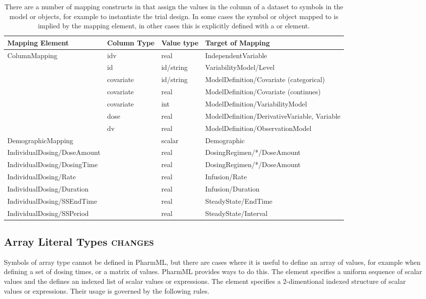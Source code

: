 \begin{table}[ht!]
\begin{center}
\small
\begin{tabular}{llll}\toprule
Mapping Element & Column Type & Value type & Target of Mapping \\\midrule
ColumnMapping & idv & real & IndependentVariable  \\
			& id			& id/string & VariabilityModel/Level \\
			& covariate & id/string &  ModelDefinition/Covariate (categorical) \\	
			& covariate & real &  ModelDefinition/Covariate (continues) \\
			& covariate & int &  ModelDefinition/VariabilityModel \\
			& dose 	& real &  ModelDefinition/DerivativeVariable, Variable \\
			& dv 	& real &  ModelDefinition/ObservationModel \\
DemographicMapping & & scalar & Demographic \\
IndividualDosing/DoseAmount & & real & DosingRegimen/*/DoseAmount \\
IndividualDosing/DosingTime & & real & DosingRegimen/*/DoseAmount \\
IndividualDosing/Rate &  & real & Infusion/Rate \\
IndividualDosing/Duration & & real &Infusion/Duration \\
IndividualDosing/SSEndTime & & real & SteadyState/EndTime \\
IndividualDosing/SSPeriod & & real & SteadyState/Interval \\\bottomrule
\end{tabular}
\end{center}
\caption{There are a number of mapping constructs in \pharmml that assign the
values in the column of a dataset to symbols in the model or objects,
for example to instantiate the trial design. In some cases the symbol
or object mapped to is implied by the mapping element, in other cases
this is explicitly defined with a  or 
element.}
\label{tab:data-set-mapping}
\end{table}%


\subsection{Array Literal Types  {\color{red} \scshape{changes}}}
Symbols of array type cannot be defined in PharmML, but there are cases where 
it is useful to define an array of values, for example when defining a set of dosing times, 
or a matrix of values. PharmML provides ways to do this. The  
element specifies a uniform sequence of scalar values and the  defines 
an indexed list of scalar values or expressions. The  element specifies 
a 2-dimentional indexed structure of scalar values or expressions. Their usage is 
governed by the following rules.

